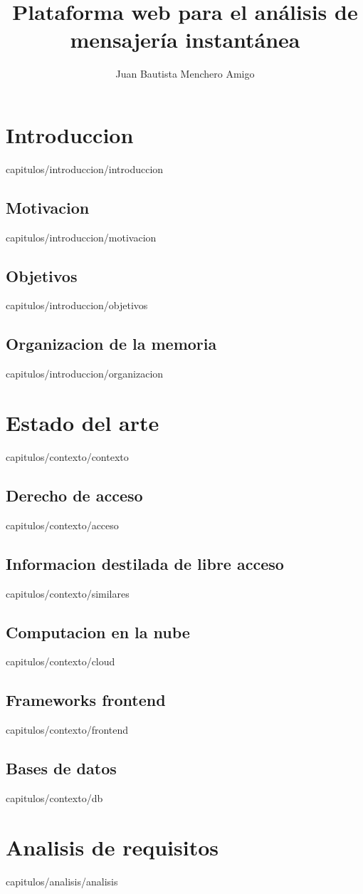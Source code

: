 \documentclass[epsbased,copyright,final,printable,covers,extendedindex,firstnumbered,tfg,gnuplot]{thesis}
\title{Plataforma web para el análisis de mensajería instantánea}
\author{Juan Bautista Menchero Amigo}
\begin{document}
\chapter{Introduccion\label{CAP:INTRODUCCION}}{capitulos/introduccion/introduccion}
  \section{Motivacion\label{SEC:MOTIVACION}}{capitulos/introduccion/motivacion}
  \section{Objetivos\label{SEC:OBJETIVOS}}{capitulos/introduccion/objetivos}
  \section{Organizacion de la memoria\label{SEC:ORGANIZACION}}{capitulos/introduccion/organizacion}

\chapter{Estado del arte\label{CAP:CONTEXTO}}{capitulos/contexto/contexto}
  \section{Derecho de acceso\label{SEC:ACCESO}}{capitulos/contexto/acceso}
  \section{Informacion destilada de libre acceso\label{SEC:SIMILARES}}{capitulos/contexto/similares}
  \section{Computacion en la nube\label{SEC:CLOUD}}{capitulos/contexto/cloud}
  \section{Frameworks frontend\label{SEC:FRONTEND}}{capitulos/contexto/frontend}
  \section{Bases de datos\label{SEC:DB}}{capitulos/contexto/db}

\chapter{Analisis de requisitos\label{CAP:ANALISIS}}{capitulos/analisis/analisis}
\end{document}
